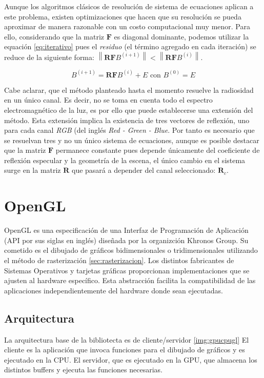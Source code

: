 Aunque los algoritmos clásicos de resolución de sistema de ecuaciones aplican a este problema, existen optimizaciones que hacen que su resolución se pueda aproximar de manera razonable con un costo computacional muy menor. Para ello, considerando que la matriz $\mathbf{F}$ es diagonal dominante, podemos utilizar la equación \ref{eq:iterativo} pues el \textit{residuo} (el término agregado en cada iteración) se reduce de la siguiente forma: $\left\|\mathbf{RF}B^{(i+1)}\right\| < \left\|\mathbf{RF}B^{(i)}\right\|$.

\begin{equation}
	B^{(i+1)}  = \mathbf{RF}B^{(i)}  + E \text{ con }  B^{(0)} = E
	\label{eq:iterativo}
\end{equation}

Cabe aclarar, que el método planteado hasta el momento resuelve la radiosidad en un único canal. Es decir, no se toma en cuenta todo el espectro electromagnético de la luz, es por ello que puede establecerse una extensión del método. Esta extensión implica la existencia de tres vectores de reflexión, uno para cada canal \textit{RGB} (del inglés \textit{Red - Green - Blue}. Por tanto es necesario que se resuelvan tres y no un único sistema de ecuaciones, aunque es posible destacar que la matriz $\mathbf{F}$ permanece constante pues depende únicamente del coeficiente de reflexión especular y la geometría de la escena, el único cambio en el sistema surge en la matriz $\mathbf{R}$ que pasará a depender del canal seleccionado: $\mathbf{R}_{c}$.

\section{OpenGL}
OpenGL es una especificación de una Interfaz de Programación de Aplicación (API por sus siglas en inglés) diseñada por la organizción Khronos Group. Su cometido es el dibujado de gráficos bidimensionales o tridimensionales utilizando el método de rasterización \ref{sec:rasterizacion}. Los distintos fabricantes de Sistemas Operativos y tarjetas gráficas proporcionan implementaciones que se ajusten al hardware específico. Esta abstracción facilita la compatibilidad de las aplicaciones independientemente del hardware donde sean ejecutadas.

\subsection{Arquitectura}
La arquitectura base de la bibliotecta es de cliente/servidor \ref{img:gpucpugl} El cliente es la aplicación que invoca funciones para el dibujado de gráficos y es ejecutado en la CPU. El servidor, que es ejecutado en la GPU, que almacena los distintos buffers y ejecuta las funciones necesarias.

